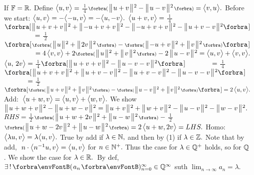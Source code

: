 \ProblemN{21}{
	\TextA{Implement the corres inner prod from a norm $\Dvert{{\cdot}}:U\rightarrow\Interval{[}{)}{0,\infty}$ satisfying [6.22].\vspace{3pt}}
}If ${\mathbb{F}}={\mathbb{R}}.$ Define $\big\langle{}u,v{}\big\rangle={}${\Large$\frac{\:1\:}{4}$}$\BigPar{\Dvertsq{u+v}-\Dvertsq{u-v}}=\Ang{v,u}.$ \;Before we start:\def\Lbreak{1pt}\def\LBREAK{6pt}\def\Endl{\vspace{\Lbreak}\parSol{}}\def\ENDL{\vspace{\LBREAK}\parSol{}}\vspace{2pt}\parSol{}
 $\big\langle{}u,v{}\big\rangle=-\big\langle{}{-u,v}{}\big\rangle=-\big\langle{}u,-v{}\big\rangle.$\Endl{}
 $\big\langle{}u+v,v{}\big\rangle={}${\Large$\frac{\:1\:}{4}$}$\BigSbra{\Dvertsq{u+v+v}+\Dvertsq{{-u+v+v}}-\Dvertsq{{-u+v+v}}-\Dvertsq{u+v-v}}$\Endl{}
 $\Blind{\Ang{u+v,v}}={}${\Large$\frac{\:1\:}{2}$}$\BigSbra{\BigPar{\Dvertsq{u}+\Dvertsq{2v}}-\BigPar{\Dvertsq{{-u+v}}+\Dvertsq{v}}}$\Endl{}
 $\Blind{\Ang{u+v,v}}=4\,\Ang{v,v}+2\BigPar{\Dvertsq{u}+\Dvertsq{v}}-2\,\Dvertsq{u-v}=\Ang{u,v}+\Ang{v,v}.$\ENDL{}
 $\big\langle{}u,\,2v{}\big\rangle={}${\Large$\frac{\:1\:}{4}$}$\BigSbra{\Dvertsq{u+v+v}-\Dvertsq{u-v-v}}$\Endl{}
 $\Blind{\Ang{u,\,2v}}={}${\Large$\frac{\:1\:}{4}$}$\BigSbra{\Dvertsq{u+v+v}+\Dvertsq{u+v-v}-\Dvertsq{u+v-v}-\Dvertsq{u-v-v}}$\Endl{}
 $\Blind{\Ang{u,\,2v}}={}${\Large$\frac{\:1\:}{2}$}$\BigSbra{\BigPar{\Dvertsq{u+v}+\Dvertsq{v}}-\BigPar{\Dvertsq{u-v}+\Dvertsq{v}}}=2\,\Ang{u,v}.$\ENDL{}
{\tgbf Add:} \,$\big\langle{}u+w,v{}\big\rangle=\big\langle{}u,v{}\big\rangle+\big\langle{}w,v{}\big\rangle.$\Endl{}
We show \:$\big\Vert\hspace{1pt}{}u+w+v{}\hspace{1pt}\big\Vert{\hspace{0.5pt}}{^2}-\big\Vert\hspace{1pt}{}u+w-v{}\hspace{1pt}\big\Vert{\hspace{0.5pt}}{^2}=\big\Vert\hspace{1pt}{}u+v{}\hspace{1pt}\big\Vert{\hspace{0.5pt}}{^2}+\big\Vert\hspace{1pt}{}w+v{}\hspace{1pt}\big\Vert{\hspace{0.5pt}}{^2}-\big\Vert\hspace{1pt}{}u-v{}\hspace{1pt}\big\Vert{\hspace{0.5pt}}{^2}-\big\Vert\hspace{1pt}{}w-v{}\hspace{1pt}\big\Vert{\hspace{0.5pt}}{^2}.$\Endl{}
$RHS={}${\Large$\frac{\:1\:}{2}$}$\BigPar{\Dvertsq{u+w+2v}+\Dvertsq{u-w}}-{}${\Large$\frac{\:1\:}{2}$}$\BigPar{\Dvertsq{u+w-2v}+\Dvertsq{u-w}}=2\,\Ang{u+w,2v}=LHS.$\ENDL{}
{\tgbf Homo:} \,$\big\langle{}\lambda u,v{}\big\rangle=\lambda\big\langle{}u,v{}\big\rangle.$ \;True by add if $\lambda\in{\mathbb{N}},$ and then by (1) if $\lambda\in{\mathbb{Z}}.$\Endl{}
Note that by add, $\;n\cdot\big\langle{}n^{-1}u,v{}\big\rangle=\big\langle{}u,v{}\big\rangle$ for $n\in{\mathbb{N}^+}.$ Thus the case for $\lambda\in{\mathbb{Q}}^+$ holds, so for ${\mathbb{Q}}$.\Endl{}
We show the case for $\lambda\in{\mathbb{R}}.$ \,By def, $\exists\,!\,\Par{a_n}{_{n=0}^\infty}\in\Qbb^{\infty}$ suth $\lim_{n\rightarrow\infty}a_n=\lambda.$\Endl{}
